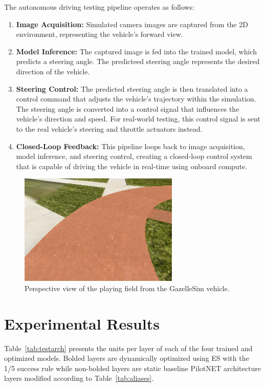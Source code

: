 \documentclass[conference]{IEEEtran}
\begin{document}
The autonomous driving testing pipeline operates as follows:

\begin{enumerate}
    \item \textbf{Image Acquisition:} Simulated camera images are captured from the 2D environment, representing the vehicle's forward view.
    \item \textbf{Model Inference:} The captured image is fed into the trained model, which predicts a steering angle. The predicteed steering angle represents the desired direction of the vehicle.
    \item \textbf{Steering Control:} The predicted steering angle is then translated into a control command that adjusts the vehicle's trajectory within the simulation. The steering angle is converted into a control signal that influences the vehicle's direction and speed. For real-world testing, this control signal is sent to the real vehicle's steering and throttle actuators instead.
    \item \textbf{Closed-Loop Feedback:} This pipeline loops back to image acquisition, model inference, and steering control, creating a closed-loop control system that is capable of driving the vehicle in real-time using onboard compute.
\end{enumerate}

\begin{figure}[ht]
    \centering
    \includegraphics[width=3in]{assets/Gazelle-Camera-View.png}
    \caption{ Perspective view of the playing field from the GazelleSim vehicle. }
    \label{fig:camview}
\end{figure}

\section{Experimental Results}


Table~\ref{tab:testarch} presents the units per layer of each of the four trained and optimized models. Bolded layers are dynamically optimized using ES with the 1/5 success rule while non-bolded layers are static baseline PilotNET architecture layers modified according to Table~\ref{tab:aliases}.
\end{document}
